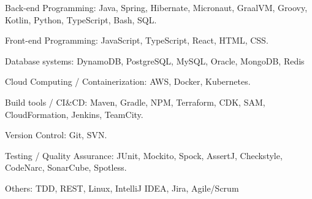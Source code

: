 

\begin{cvskills}


  \cvskill
    {Back-end Programming:} %
    {Java, Spring, Hibernate, Micronaut, GraalVM, Groovy, Kotlin, Python, TypeScript, Bash, SQL.} %

  \cvskill
    {Front-end Programming:} %
    {JavaScript, TypeScript, React, HTML, CSS.} %

  \cvskill
    {Database systems:} %
    {DynamoDB, PostgreSQL, MySQL, Oracle, MongoDB, Redis} %

  \cvskill
    {Cloud Computing / Containerization:} %
    {AWS, Docker, Kubernetes.} %

  \cvskill
    {Build tools / CI\&CD:} %
    {Maven, Gradle, NPM, Terraform, CDK, SAM, CloudFormation, Jenkins, TeamCity.} %

  \cvskill
    {Version Control:} %
    {Git, SVN.} %

  \cvskill
    {Testing / Quality Assurance:} %
    {JUnit, Mockito, Spock, AssertJ, Checkstyle, CodeNarc, SonarCube, Spotless.} %
    
  \cvskill
    {Others:} %
    {TDD, REST, Linux, IntelliJ IDEA, Jira, Agile/Scrum} %



\end{cvskills}
